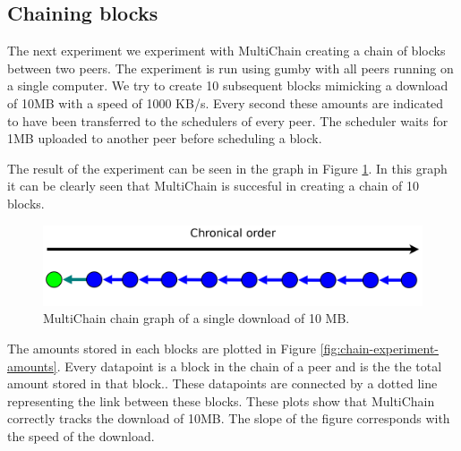\subsection{Chaining blocks}
The next experiment we experiment with MultiChain creating a chain of blocks between two peers.
The experiment is run using gumby with all peers running on a single computer.
We try to create 10 subsequent blocks mimicking a download of 10MB with a speed of 1000 KB/s.
Every second these amounts are indicated to have been transferred to the schedulers of every peer.
The scheduler waits for 1MB uploaded to another peer before scheduling a block.

The result of the experiment can be seen in the graph in Figure \ref{fig:chain-experiment-graph}.
In this graph it can be clearly seen that MultiChain is succesful in creating a chain of 10 blocks.

\begin{figure}[!h]
	\centerline{\includegraphics[scale=0.06]{experimentation/chain/chain.png}}
	\caption{MultiChain chain graph of a single download of 10 MB.}
	\label{fig:chain-experiment-graph}
\end{figure}

The amounts stored in each blocks are plotted in Figure \ref{fig:chain-experiment-amounts}.
Every datapoint is a block in the chain of a peer and is the the total amount stored in that block..
These datapoints are connected by a dotted line representing the link between these blocks.
These plots show that MultiChain correctly tracks the download of 10MB.
The slope of the figure corresponds with the speed of the download.

